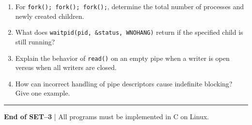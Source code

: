 \documentclass[9pt,a4paper]{extarticle}
\begin{document}
\begin{minipage}[t][0.47\textheight][t]{\textwidth}
\begin{enumerate}[
label=\textbf{Q\arabic*.},
leftmargin=6mm,
itemsep=2pt,
topsep=2pt
]

\item For \texttt{fork(); fork(); fork();}, determine
the total number of processes and newly created children.

\item What does \texttt{waitpid(pid, \&status, WNOHANG)}
return if the specified child is still running?

\item Explain the behavior of \texttt{read()} on an empty
pipe when a writer is open versus when all writers are closed.

\item How can incorrect handling of pipe descriptors cause
indefinite blocking? Give one example.

\end{enumerate}

\vfill
\hrule
\begin{center}
{\scriptsize\textbf{End of SET--3}
\quad | \quad All programs must be implemented in C on Linux.}
\end{center}

\end{minipage}
\end{document}
